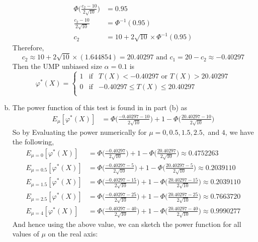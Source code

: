 \documentclass[a4paper,11pt]{article}
\begin{document}
\begin{enumerate}[(a)]
\begin{align*}
			 \Phi \bigg(  \frac{c_2-10}{2\sqrt{10}}\bigg) &= 0.95\\
			 \frac{c_2-10}{2\sqrt{10}} &= \Phi^{-1}(0.95)\\
			c_2 &= 10+2\sqrt{10} \times \Phi^{-1}(0.95)
		\end{align*}
	Therefore,
		\[
			c_2 \approx10+2\sqrt{10} \times(1.644854) =  20.40297  \mbox{ and } c_1 = 20-c_2 \approx -0.40297
		\]
	Then the UMP unbiased size $\alpha = 0.1$ is 
		  \[
		\varphi^*(X)= \left\{ 
			\begin{array}{rcl}
			1 & \mbox{if}
			&  T(X)<-0.40297 \mbox{ or } T(X)>20.40297 \\ 0 & \mbox{if} & -0.40297\le T(X) \le 20.40297 \\
			\end{array}\right.
		\]
	\newpage
	\item
	The power function of this test is found in in part (b) as 
		\begin{align*}
			E_{\mu}[\varphi^*(X)] & = \Phi\bigg( \frac{-0.40297-10}{2\sqrt{10}}\bigg) +1 - \Phi \bigg(  \frac{20.40297-10}{2\sqrt{10}}\bigg)
		\end{align*}
	So by Evaluating the power numerically for $\mu = 0, 0.5, 1.5, 2.5,$ and $4$, we have the following,
		\begin{align*}
			E_{\mu=0}[\varphi^*(X)] & = \Phi\bigg( \frac{-0.40297}{2\sqrt{10}}\bigg) +1 - \Phi \bigg(  \frac{20.40297}{2\sqrt{10}}\bigg) \approx 0.4752263 \\
			E_{\mu=0.5}[\varphi^*(X)] & = \Phi\bigg( \frac{-0.40297-5}{2\sqrt{10}}\bigg) +1 - \Phi \bigg(  \frac{20.40297-5}{2\sqrt{10}}\bigg) \approx0.2039110  \\
			E_{\mu=1.5}[\varphi^*(X)] & = \Phi\bigg( \frac{-0.40297-15}{2\sqrt{10}}\bigg) +1 - \Phi \bigg(  \frac{20.40297-15}{2\sqrt{10}}\bigg) \approx0.2039110  \\
			E_{\mu=2.5}[\varphi^*(X)] & = \Phi\bigg( \frac{-0.40297-25}{2\sqrt{10}}\bigg) +1 - \Phi \bigg(  \frac{20.40297-25}{2\sqrt{10}}\bigg) \approx 0.7663720 \\
			E_{\mu=4}[\varphi^*(X)] & = \Phi\bigg( \frac{-0.40297-40}{2\sqrt{10}}\bigg) +1 - \Phi \bigg(  \frac{20.40297-40}{2\sqrt{10}}\bigg) \approx 0.9990277
		\end{align*}
	And hence using the above value, we can sketch the power function for all values of $\mu$ on the real axis:

\end{enumerate}
\end{document}
